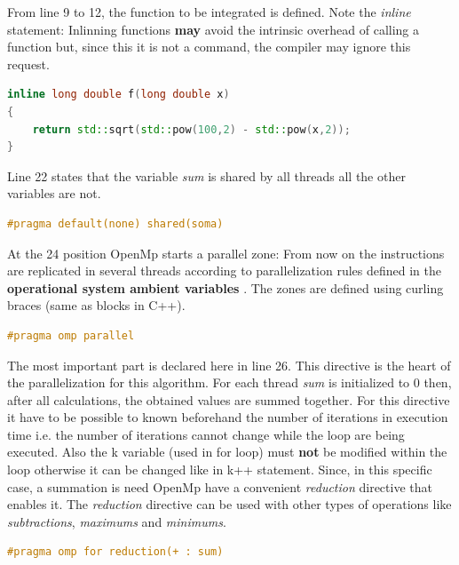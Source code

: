		\par From line 9 to 12, the function to be integrated is defined. Note the \textit{inline} statement: Inlinning functions \textbf{may} avoid the intrinsic overhead of calling a function but, since this it is not a command, the compiler may ignore this request.
		\begin{lstlisting}[language=C++]
inline long double f(long double x)
{
	return std::sqrt(std::pow(100,2) - std::pow(x,2));
}
		\end{lstlisting}
		
		\par Line 22 states that the variable \textit{sum} is shared by all threads all the other variables are not.
		\begin{lstlisting}[language=C++]
#pragma default(none) shared(soma)
		\end{lstlisting}
		
		\par At the 24 position OpenMp starts a parallel zone: From now on the instructions are replicated in several  threads according to parallelization rules defined in the \textbf{operational system ambient variables} \cite{openmp08SV}. The zones are defined using curling braces (same as blocks in C++).
		\begin{lstlisting}[language=C++]
#pragma omp parallel
		\end{lstlisting}
	
		\par The most important part is declared here in line 26. This directive is the heart of the parallelization for this algorithm. For each thread \textit{sum} is initialized to 0 then, after all calculations, the obtained values are summed together. For this directive it have to be possible to known beforehand the number of iterations in execution time i.e. the number of iterations cannot change while the loop are being executed. Also the k variable (used in for loop) must \textbf{not} be modified within the loop otherwise it can be changed like in k++ statement. Since, in this specific case, a summation is need OpenMp have a convenient \textit{reduction} directive that enables it. The \textit{reduction} directive can be used with other types of operations like \textit{subtractions}, \textit{maximums} and \textit{minimums}. 
		
		\begin{lstlisting}[language=C++]
#pragma omp for reduction(+ : sum)
		\end{lstlisting}
	
